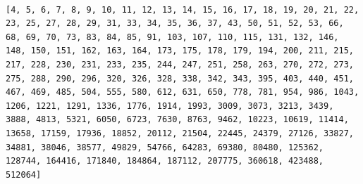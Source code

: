 \documentclass{book}
\begin{document}
\begin{verbatim}

[4, 5, 6, 7, 8, 9, 10, 11, 12, 13, 14, 15, 16, 17, 18, 19, 20, 21, 22, 23, 25, 27, 28, 29, 31, 33, 34, 35, 36, 37, 43, 50, 51, 52, 53, 66, 68, 69, 70, 73, 83, 84, 85, 91, 103, 107, 110, 115, 131, 132, 146, 148, 150, 151, 162, 163, 164, 173, 175, 178, 179, 194, 200, 211, 215, 217, 228, 230, 231, 233, 235, 244, 247, 251, 258, 263, 270, 272, 273, 275, 288, 290, 296, 320, 326, 328, 338, 342, 343, 395, 403, 440, 451, 467, 469, 485, 504, 555, 580, 612, 631, 650, 778, 781, 954, 986, 1043, 1206, 1221, 1291, 1336, 1776, 1914, 1993, 3009, 3073, 3213, 3439, 3888, 4813, 5321, 6050, 6723, 7630, 8763, 9462, 10223, 10619, 11414, 13658, 17159, 17936, 18852, 20112, 21504, 22445, 24379, 27126, 33827, 34881, 38046, 38577, 49829, 54766, 64283, 69380, 80480, 125362, 128744, 164416, 171840, 184864, 187112, 207775, 360618, 423488, 512064]

\end{verbatim}
\end{document}
